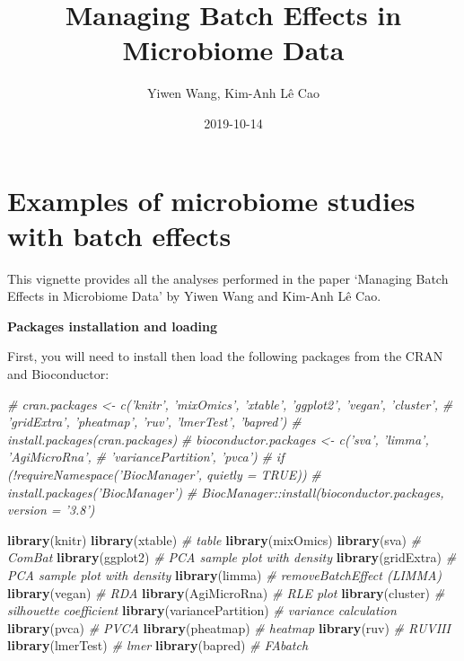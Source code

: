 \documentclass[]{book}
\title{Managing Batch Effects in Microbiome Data}
\author{Yiwen Wang, Kim-Anh Lê Cao}
\date{2019-10-14}
\newenvironment{Shaded}{\begin{snugshade}}{\end{snugshade}}
\newcommand{\KeywordTok}[1]{\textcolor[rgb]{0.13,0.29,0.53}{\textbf{#1}}}
\newcommand{\CommentTok}[1]{\textcolor[rgb]{0.56,0.35,0.01}{\textit{#1}}}
\newcommand{\NormalTok}[1]{#1}
\begin{document}
\maketitle

{
\setcounter{tocdepth}{3}
\tableofcontents
}
\chapter{Examples of microbiome studies with batch
effects}\label{examples-of-microbiome-studies-with-batch-effects}

This vignette provides all the analyses performed in the paper `Managing
Batch Effects in Microbiome Data' by Yiwen Wang and Kim-Anh Lê Cao.

\textbf{Packages installation and loading}

First, you will need to install then load the following packages from
the CRAN and Bioconductor:

\begin{Shaded}
\begin{Highlighting}[]
\CommentTok{# cran.packages <- c('knitr', 'mixOmics', 'xtable', 'ggplot2', 'vegan', 'cluster',}
\CommentTok{#                   'gridExtra', 'pheatmap', 'ruv', 'lmerTest', 'bapred')}
\CommentTok{# install.packages(cran.packages)}
\CommentTok{# bioconductor.packages <- c('sva', 'limma', 'AgiMicroRna', }
\CommentTok{#                           'variancePartition', 'pvca')}
\CommentTok{# if (!requireNamespace('BiocManager', quietly = TRUE))}
\CommentTok{#     install.packages('BiocManager')}
\CommentTok{# BiocManager::install(bioconductor.packages, version = '3.8')}

\KeywordTok{library}\NormalTok{(knitr)}
\KeywordTok{library}\NormalTok{(xtable) }\CommentTok{# table}
\KeywordTok{library}\NormalTok{(mixOmics)}
\KeywordTok{library}\NormalTok{(sva) }\CommentTok{# ComBat}
\KeywordTok{library}\NormalTok{(ggplot2) }\CommentTok{# PCA sample plot with density}
\KeywordTok{library}\NormalTok{(gridExtra) }\CommentTok{# PCA sample plot with density}
\KeywordTok{library}\NormalTok{(limma) }\CommentTok{# removeBatchEffect (LIMMA)}
\KeywordTok{library}\NormalTok{(vegan) }\CommentTok{# RDA}
\KeywordTok{library}\NormalTok{(AgiMicroRna) }\CommentTok{# RLE plot}
\KeywordTok{library}\NormalTok{(cluster) }\CommentTok{# silhouette coefficient}
\KeywordTok{library}\NormalTok{(variancePartition) }\CommentTok{# variance calculation}
\KeywordTok{library}\NormalTok{(pvca) }\CommentTok{# PVCA}
\KeywordTok{library}\NormalTok{(pheatmap) }\CommentTok{# heatmap}
\KeywordTok{library}\NormalTok{(ruv) }\CommentTok{# RUVIII}
\KeywordTok{library}\NormalTok{(lmerTest) }\CommentTok{# lmer}
\KeywordTok{library}\NormalTok{(bapred) }\CommentTok{# FAbatch}
\end{Highlighting}
\end{Shaded}
\end{document}

